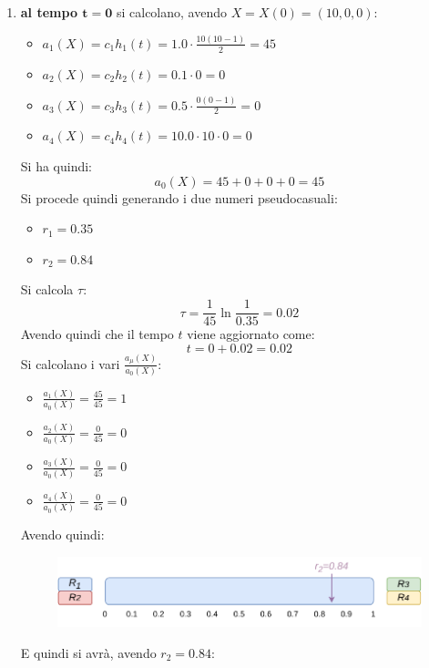 \documentclass{article}
\begin{document}
\begin{enumerate}[label=\roman*)]
  \item \textbf{al tempo $\mathbf{t=0}$} si calcolano, avendo $X=X(0)=(10,0,0)$:
  \begin{multicols}{2}
    \begin{itemize}
      \item {\small{$a_1(X)=c_1h_1(t)=1.0\cdot\frac{10(10-1)}{2}=45$}}
      \item $a_2(X)=c_2h_2(t)=0.1\cdot 0=0$
      \item $a_3(X)=c_3h_3(t)=0.5\cdot \frac{0(0-1)}{2}=0$
      \item $a_4(X)=c_4h_4(t)=10.0\cdot 10 \cdot 0=0$
    \end{itemize}
  \end{multicols}
  Si ha quindi:
  \[a_0(X)=45+0+0+0=45\]
  Si procede quindi generando i due numeri pseudocasuali:
  \begin{multicols}{2}
    \begin{itemize}
      \item $r_1=0.35$
      \item $r_2=0.84$
    \end{itemize}
  \end{multicols}
  Si calcola $\tau$:
  \[\tau=\frac{1}{45}\ln\frac{1}{0.35}=0.02\]
  Avendo quindi che il tempo $t$ viene aggiornato come:
  \[t=0+0.02=0.02\]
  Si calcolano i vari $\frac{a_\mu(X)}{a_0(X)}$:
  \begin{multicols}{2}
    \begin{itemize}
      \item $\frac{a_1(X)}{a_0(X)}=\frac{45}{45}=1$
      \item $\frac{a_2(X)}{a_0(X)}=\frac{0}{45}=0$
      \item $\frac{a_3(X)}{a_0(X)}=\frac{0}{45}=0$
      \item $\frac{a_4(X)}{a_0(X)}=\frac{0}{45}=0$
    \end{itemize}
  \end{multicols}
  Avendo quindi:
  \begin{figure}[H]
    \centering
    \includegraphics[scale = 0.8]{img/t1.pdf}
  \end{figure}
  E quindi si avrà, avendo $r_2=0.84$:

\end{enumerate}
\end{document}
